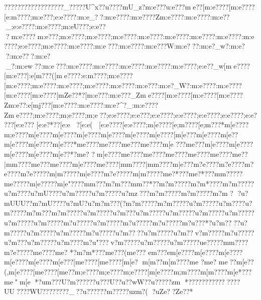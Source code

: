 {{{{{{{{{{{{{{{{{{{{{{{{{{{{{{{{{{{{{{{{{{{{{{{{{{{{{{{{{{{{{{{{{{{{{{{{{{{{{{{{{{{{{{{{{{{{{{{{{{{{{{{{{{{{{{{{{{{{{{{{{{{{{{{{{{{{{{{{{{{{{{{{{{{{{{{{{{{{{{{{{{{{{{{{{{{{{{{{{{{{{{{{{{{{{{{{{{{{{{{{{{{{{{{{{{{{{{{{{{{{{{{{{{{{{{{{{{{{{{{{{{{{{{{{{{{{{{{{{{{{{{{{{{{{{{{{{{{{{{{{{{{{{{{{{{{{{{{{{{{{{{{{{{{{{{{{{{{{{{{{{{{{{{{{{{{{{{{{{{{{{{{{{{{{{{{{{{{{{{{{{{{{{{{{{{{{{{{{{{{{{{{{{{{{{{{{{{{{{{{{{{{{{{{{{{{{{{{{{{{{{{{{{{{{{{{{{{{{{{{{{{{{{{{{{{{{{{{{{{{{{{??}?????? ??????????}_?????}U^x?}?u????}{mU_z?{m:e?? ?u:e???{me??[m:e????[m:e????[e:m????;m:e???;e:e????:m:e_??:m:e????:m:e????Zm:e????:m:e????:m:e??_;e:e????:m:e????;m:eU???;e:e???m:e????m:e???;m:e????;m:e????;m:e????:m:e????:m:e????:m:e????:m:e????:m:e????;e:e????;m:e????:m:e????:m:e???:m:e????:m:e???W:m:e???:m:e?_w?:m:e}??:m:e???:m:e?_?:m:ew??:m:e???:m:e????:m:e????:m:e????:m:e????:m:e????;e:e??_w[me????[m:e???]:e[m???([me????:e:m????;m:e????[m:e????;m:e????:m:e????;m:e????:m:e????:m:e}???:m:e?_W?:m:e????:m:e????[m:e????[m:e????[mZe??*?[m:e???:m:e???_Zme????[m:e????[m:e????[m:e????Zm:e??:e[mj???[m:e????:m:e????:m:e?^?_:m:e????Zme????;m:e????;m;e????;m;e??};e:e????;e:e???;e:e????;e:e????;e:e????;e:e????;e:e????[e:e???
[e:e?*??[e:e
?[e:e(
[e:e????[e:e????;m[e????[e;m????[e;m???*{m[e????{m;e????{m[e????{m[e????{m[e????{m[e????{m[e????{m[e????[m[e???{m[e????{m[e??{m[e????{m[e????{m[e???*{m{e????{m{e????{m{e???{m{e????{m[e
???{m{e???{m[e????{m[e????{m[e????{m[e????{m[e??*?{m{e?
?{m[e????{m{e????{m{e????{m{e????{m{e????{m{e????{m{e??|m{m????{m{e???{m{e????{m|e????{m{e????|m{m????|m{m????{m|e ???{m?e????{m?e????{m?e????{m?e?????m|m?????m|e????{m?e?????m|m?????m{e?*???m{e?*???m{m?????m{e?????m|e?????m|e"????m{m???m?m???m{m??*??m?m?????m?m*????m?m?????u?m}????u?mU????u?m?????u?m?????u?mz???m?m?????m?m?????m?m
?
?u?mUUU??m?mU????u?m}U?u?m?m???(?m?m?????m?m?????u?m?????u?m????u?m?????m?m???m?m?????u?m?????u?m???u?m?????u?m?????u?m?????u?m?????u?m?????u?m?????m?u?????u?m?????m?u?????m?u?????m?u???*?u?m????u?m?????u?m?????u?m?????m?u?????u?m????u?m?????u?m??v?m?????m?u?????u?m???u?m?????u?m????m?u"???v?m?????u?m?????u?m?????u{e?????m{m????{m?e?????m{e ????m{e? *?{m?m*???{m{e???({m{e??? {e{m???e{m[e????{m[e????{m[e????{m[e????{m[e????{m[e???[m{e????[m{e????[m[e ?
{m[m??{m[m????{m{e ?  {m{e?   {m{e?? {m[e??(,{m[e????[m{e????[m{e??{m;e????{m;e????{m;e????[m[e????{m;m????{m[m????{m[e*???{m{e "{m[e
*?{u{m???U?}{m?????}?u???U?}?u??wW?}?u?????}zm
*???} ?????} ???????UU????WU??}??????}_^^_?}?u?????}?m?????uzm?(
?uZe??}Ze??*
}}}}}}}}}}}}}}}}}}}}}}}}}}}}}}}}}}}}}}}}}}}}}}}}}}}}}}}}}}}}}}}}}}}}}}}}}}}}}}}}}}}}}}}}}}}}}}}}}}}}}}}}}}}}}}}}}}}}}}}}}}}}}}}}}}}}}}}}}}}}}}}}}}}}}}}}}}}}}}}}}}}}}}}}}}}}}}}}}}}}}}}}}}}}}}}}}}}}}}}}}}}}}}}}}}}}}}}}}}}}}}}}}}}}}}}}}}}}}}}}}}}}}}}}}}}}}}}}}}}}}}}}}}}}}}}}}}}}}}}}}}}}}}}}}}}}}}}}}}}}}}}}}}}}}}}}}}}}}}}}}}}}}}}}}}}}}}}}}}}}}}}}}}}}}}}}}}}}}}}}}}}}}}}}}}}}}}}}}}}}}}}}}}}}}}}}}}}}}}}}}}}}}}}}}}}}}}}}}}}}}}}}}}}}}}}}}}}}}}}}}}}}}}}}}}}}}}}}}}}}}}}}}}}}}}}}}}}}}}}}}}}}}}}}}}}}}}}}}}}}}}}}}}}}}}}}}}}}}}}}}}}}}}}}}}}}}}}}}}}}}}}}}}}}}}}}}
